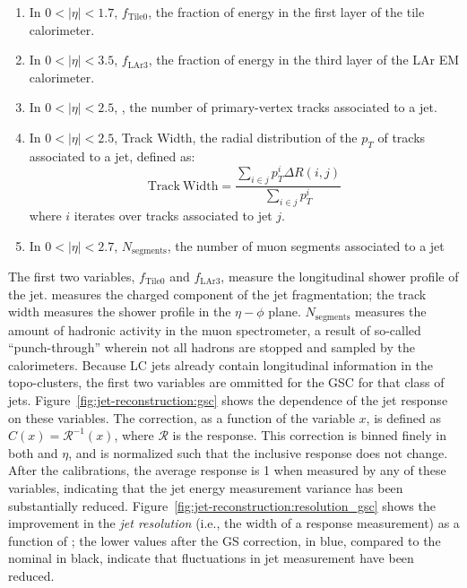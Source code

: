 \begin{enumerate}
	\item In $0 < |\eta| < 1.7$, $f_{\mathrm{Tile0}}$, the fraction of energy in the first layer of the tile calorimeter.
	\item In $0 < |\eta| < 3.5$, $f_{\mathrm{LAr3}}$, the fraction of energy in the third layer of the LAr EM calorimeter.
	\item In $0 < |\eta| < 2.5$, \ntrk, the number of primary-vertex tracks associated to a jet.
	\item In $0 < |\eta| < 2.5$, Track Width, the radial distribution of the $p_T$ of tracks associated to a jet, defined as:
	\begin{equation}
	\mathrm{Track~Width} = \frac{\sum_{i \in j} p_T^{i} \Delta R(i,j) }{\sum_{i \in j} p_T^i}
	\end{equation}
	where $i$ iterates over tracks associated to jet $j$.
	\item In $0 < |\eta| < 2.7$, $N_\mathrm{segments}$, the number of muon segments associated to a jet
\end{enumerate}
The first two variables, $f_{\mathrm{Tile0}}$ and $f_{\mathrm{LAr3}}$, measure the longitudinal shower profile of the jet. \ntrk measures the charged component of the jet fragmentation; the track width measures the shower profile in the $\eta-\phi$ plane. $N_{\mathrm{segments}}$ measures the amount of hadronic activity in the muon spectrometer, a result of so-called ``punch-through'' wherein not all hadrons are stopped and sampled by the calorimeters. Because LC jets already contain longitudinal information in the topo-clusters, the first two variables are ommitted for the GSC for that class of jets. Figure~\ref{fig:jet-reconstruction:gsc} shows the dependence of the jet response on these variables. The correction, as a function of the variable $x$, is defined as $C(x) = \mathcal{R}^{-1}(x)$, where $\mathcal{R}$ is the \pt response. This correction is binned finely in both \pt and $\eta$, and is normalized such that the inclusive response does not change. After the calibrations, the average response is 1 when measured by any of these variables, indicating that the jet energy measurement variance has been substantially reduced. Figure~\ref{fig:jet-reconstruction:resolution_gsc} shows the improvement in the \textit{jet resolution} (i.e., the width of a response measurement) as a function of \pt; the lower values after the GS correction, in blue, compared to the nominal in black, indicate that fluctuations in jet measurement have been reduced.


